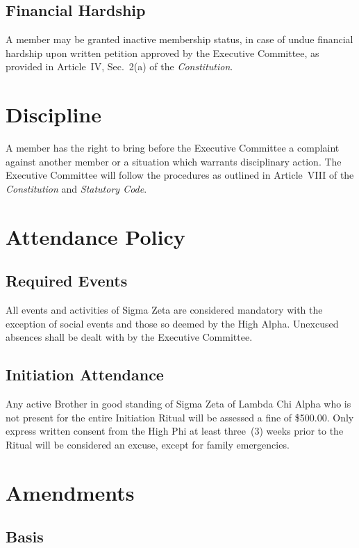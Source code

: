 \documentclass{article}
\begin{document}
\subsection{Financial Hardship}

A member may be granted inactive membership status, in case of undue financial
hardship upon written petition approved by the Executive Committee, as provided
in Article~IV, Sec.~2(a) of the \emph{Constitution}.

\section{Discipline}

A member has the right to bring before the Executive Committee a complaint
against another member or a situation which warrants disciplinary action. The
Executive Committee will follow the procedures as outlined in Article~VIII of
the \emph{Constitution} and \emph{Statutory Code}.

\section{Attendance Policy}\label{Attendance Policy}

\subsection{Required Events}

All events and activities of Sigma Zeta are considered mandatory with the
exception of social events and those so deemed by the High Alpha. Unexcused
absences shall be dealt with by the Executive Committee.

\subsection{Initiation Attendance}

Any active Brother in good standing of Sigma Zeta of Lambda Chi Alpha who is not
present for the entire Initiation Ritual will be assessed a fine of \$500.00.
Only express written consent from the High Phi at least three~(3) weeks prior to
the Ritual will be considered an excuse, except for family emergencies.

\section{Amendments}

\subsection{Basis}
\end{document}
